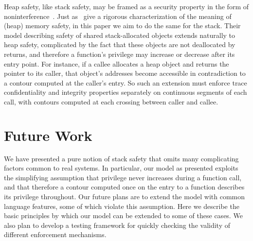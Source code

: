 \documentclass[acmsmall,review,anonymous]{acmart}\settopmatter{printfolios=true,printccs=false,printacmref=false}
\begin{document}
Heap safety, like stack safety, may be framed as a security property
in the form of
noninterference~\citep{DBLP:conf/post/AmorimHP18}\ifaftersubmission{}\fi. Just
as~\citeauthor{DBLP:conf/post/AmorimHP18} give a rigorous
characterization of the meaning of (heap) memory safety, in this paper
we aim to do the same for the stack.
%
Their model describing safety of shared stack-allocated
objects extends naturally to heap safety, complicated by the fact that
these objects are not deallocated by returns, and therefore a
function's privilege may increase or decrease after its entry
point. For instance, if a callee allocates a heap object and returns
the pointer to its caller, that object's addresses become accessible
in contradiction to a contour computed at the caller's entry. So such
an extension must enforce trace confidentiality and integrity
properties separately on continuous segments of each call, with
contours computed at each crossing between caller and callee.  

\section{Future Work}
  \label{sec:future}

  We have presented a pure notion of stack safety that omits many complicating
  factors common to real systems. In particular, our model as presented exploits
  the simplifying assumption that privilege never increases during a function
  call, and that therefore a contour computed once on the entry to a function
  describes its privilege throughout. Our future plans are to extend the model
  with common language features, some of which violate this assumption. Here we
  describe the basic principles by which our model can be extended to some of
  these cases. We also plan to develop a testing framework for quickly
  checking the validity of different enforcement mechanisms.
\end{document}
